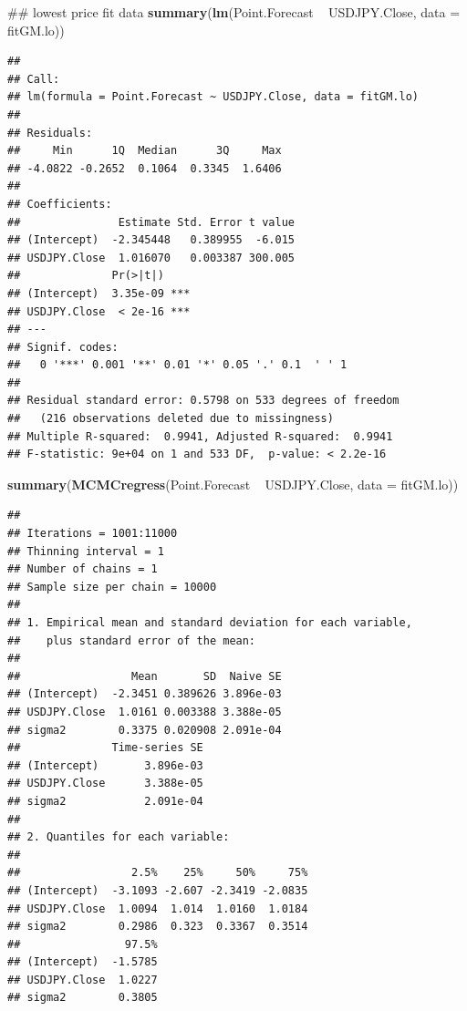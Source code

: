 \documentclass[]{tufte-book}
\newenvironment{Shaded}{}{}
\newcommand{\KeywordTok}[1]{\textcolor[rgb]{0.00,0.44,0.13}{\textbf{#1}}}
\newcommand{\DataTypeTok}[1]{\textcolor[rgb]{0.56,0.13,0.00}{#1}}
\newcommand{\StringTok}[1]{\textcolor[rgb]{0.25,0.44,0.63}{#1}}
\newcommand{\OperatorTok}[1]{\textcolor[rgb]{0.40,0.40,0.40}{#1}}
\newcommand{\NormalTok}[1]{#1}
\begin{document}
\begin{Shaded}
\begin{Highlighting}[]
\NormalTok{## lowest price fit data}
\KeywordTok{summary}\NormalTok{(}\KeywordTok{lm}\NormalTok{(Point.Forecast }\OperatorTok{~}\StringTok{ }\NormalTok{USDJPY.Close, }\DataTypeTok{data =}\NormalTok{ fitGM.lo))}
\end{Highlighting}
\end{Shaded}

\begin{verbatim}
## 
## Call:
## lm(formula = Point.Forecast ~ USDJPY.Close, data = fitGM.lo)
## 
## Residuals:
##     Min      1Q  Median      3Q     Max 
## -4.0822 -0.2652  0.1064  0.3345  1.6406 
## 
## Coefficients:
##               Estimate Std. Error t value
## (Intercept)  -2.345448   0.389955  -6.015
## USDJPY.Close  1.016070   0.003387 300.005
##              Pr(>|t|)    
## (Intercept)  3.35e-09 ***
## USDJPY.Close  < 2e-16 ***
## ---
## Signif. codes:  
##   0 '***' 0.001 '**' 0.01 '*' 0.05 '.' 0.1  ' ' 1
## 
## Residual standard error: 0.5798 on 533 degrees of freedom
##   (216 observations deleted due to missingness)
## Multiple R-squared:  0.9941, Adjusted R-squared:  0.9941 
## F-statistic: 9e+04 on 1 and 533 DF,  p-value: < 2.2e-16
\end{verbatim}

\begin{Shaded}
\begin{Highlighting}[]
\KeywordTok{summary}\NormalTok{(}\KeywordTok{MCMCregress}\NormalTok{(Point.Forecast }\OperatorTok{~}\StringTok{ }\NormalTok{USDJPY.Close, }
    \DataTypeTok{data =}\NormalTok{ fitGM.lo))}
\end{Highlighting}
\end{Shaded}

\begin{verbatim}
## 
## Iterations = 1001:11000
## Thinning interval = 1 
## Number of chains = 1 
## Sample size per chain = 10000 
## 
## 1. Empirical mean and standard deviation for each variable,
##    plus standard error of the mean:
## 
##                 Mean       SD  Naive SE
## (Intercept)  -2.3451 0.389626 3.896e-03
## USDJPY.Close  1.0161 0.003388 3.388e-05
## sigma2        0.3375 0.020908 2.091e-04
##              Time-series SE
## (Intercept)       3.896e-03
## USDJPY.Close      3.388e-05
## sigma2            2.091e-04
## 
## 2. Quantiles for each variable:
## 
##                 2.5%    25%     50%     75%
## (Intercept)  -3.1093 -2.607 -2.3419 -2.0835
## USDJPY.Close  1.0094  1.014  1.0160  1.0184
## sigma2        0.2986  0.323  0.3367  0.3514
##                97.5%
## (Intercept)  -1.5785
## USDJPY.Close  1.0227
## sigma2        0.3805
\end{verbatim}
\end{document}
